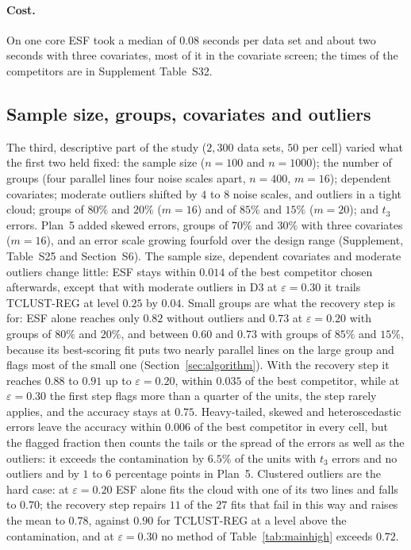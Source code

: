 \paragraph{Cost.} On one core ESF took a median of $0.08$ seconds per data set and about two
seconds with three covariates, most of it in the covariate screen; the times of the
competitors are in Supplement Table~S32.

\subsection{Sample size, groups, covariates and outliers}
\label{sec:further}

The third, descriptive part of the study ($2{,}300$ data sets, $50$ per cell) varied what the
first two held fixed: the sample size ($n=100$ and $n=1000$); the number of groups (four
parallel lines four noise scales apart, $n=400$, $m=16$); dependent covariates; moderate
outliers shifted by $4$ to $8$ noise scales, and outliers in a tight cloud; groups of $80\%$
and $20\%$ ($m=16$) and of $85\%$ and $15\%$ ($m=20$); and $t_3$ errors. Plan~5 added skewed
errors, groups of $70\%$ and $30\%$ with three covariates ($m=16$), and an error scale growing
fourfold over the design range (Supplement, Table~S25 and Section~S6). The sample size,
dependent covariates and moderate outliers change little: ESF stays within $0.014$ of the best
competitor chosen afterwards, except that with moderate outliers in D3 at $\varepsilon=0.30$ it
trails TCLUST-REG at level $0.25$ by $0.04$. Small groups are what the recovery step is for:
ESF alone reaches only $0.82$ without outliers and $0.73$ at $\varepsilon=0.20$ with groups of
$80\%$ and $20\%$, and between $0.60$ and $0.73$ with groups of $85\%$ and $15\%$, because its
best-scoring fit puts two nearly parallel lines on the large group and flags most of the small
one (Section~\ref{sec:algorithm}). With the recovery step it reaches $0.88$ to $0.91$ up to
$\varepsilon=0.20$, within $0.035$ of the best competitor, while at $\varepsilon=0.30$ the
first step flags more than a quarter of the units, the step rarely applies, and the accuracy
stays at $0.75$. Heavy-tailed, skewed and heteroscedastic errors leave the accuracy within
$0.006$ of the best competitor in every cell, but the flagged fraction then counts the tails
or the spread of the errors as well as the outliers: it exceeds the contamination by $6.5\%$
of the units with $t_3$ errors and no outliers and by $1$ to $6$ percentage points in Plan~5. Clustered outliers are the hard
case: at $\varepsilon=0.20$ ESF alone fits the cloud with one of its two lines and falls to
$0.70$; the recovery step repairs $11$ of the $27$ fits that fail in this way and raises the
mean to $0.78$, against $0.90$ for TCLUST-REG at a level above the contamination, and at
$\varepsilon=0.30$ no method of Table~\ref{tab:mainhigh} exceeds $0.72$.

